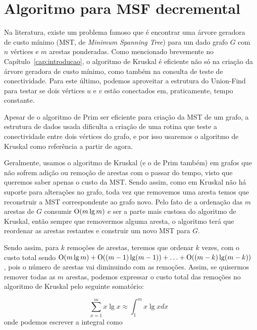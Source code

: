 
\chapter{Algoritmo para MSF decremental}

\enlargethispage{.8\baselineskip}

Na literatura, existe um problema famoso que é encontrar uma árvore geradora de custo mínimo (MST, de \textit{Minimum Spanning Tree}) para um dado grafo $G$ com $n$ vértices e $m$ arestas ponderadas. Como mencionado brevemente no Capítulo~\ref{cap:introducao}, o algoritmo de Kruskal é eficiente não só na criação da árvore geradora de custo mínimo, como também na consulta de teste de conectividade. Para este último, podemos aproveitar a estrutura do Union-Find para testar se dois vértices $u$ e $v$ estão conectados em, praticamente, tempo constante.

Apesar de o algoritmo de Prim ser eficiente para criação da MST de um grafo, a estrutura de dados usada dificulta a criação de uma rotina que teste a conectividade entre dois vértices do grafo, e por isso usaremos o algoritmo de Kruskal como referência a partir de agora.

Geralmente, usamos o algoritmo de Kruskal (e o de Prim também) em grafos que não sofrem adição ou remoção de arestas com o passar do tempo, visto que queremos saber apenas o custo da MST. Sendo assim, como em Kruskal não há suporte para alterações no grafo, toda vez que removemos uma aresta temos que reconstruir a MST correspondente ao grafo novo. Pelo fato de a ordenação das $m$ arestas de $G$ consumir $\mathrm{O}(m \lg m)$ e ser a parte mais custosa do algoritmo de Kruskal, então sempre que removermos alguma aresta, o algoritmo terá que reordenar as arestas restantes e construir um novo MST para $G$.

Sendo assim, para $k$ remoções de arestas, teremos que ordenar $k$ vezes, com o custo total sendo $\mathrm{O}(m \lg m) + \mathrm{O}((m - 1) \lg (m - 1)) + \ldots + \mathrm{O}((m - k) \lg (m - k))$, pois o número de arestas vai diminuindo com as remoções. Assim, se quisermos remover todas as $m$ arestas, podemos expressar o custo total das remoções no algoritmo de Kruskal pelo seguinte somatório:

\begin{equation}
    \sum_{x=1}^{m} x \lg x \approx \int_{1}^{m} x \lg x dx
    \label{first-equation}
\end{equation}
onde podemos escrever a integral como

